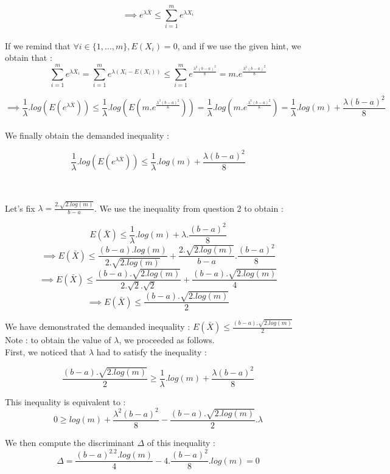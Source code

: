 \documentclass[final,3p,times,12pt]{article}
\begin{document}
\[
\implies  e^{\lambda\bar{X}} \leq \sum_{i=1}^m e^{\lambda X_i} \]\\

If we remind that $\forall i \in \{1,\dots,m\}, E(X_i) = 0$, and if we use the given hint, we obtain that : 
\[
\sum_{i=1}^m e^{\lambda X_i} = \sum_{i=1}^m e^{\lambda(X_i - E(X_i))} \leq \sum_{i=1}^m e^{\frac{\lambda^2(b-a)^2}{8}} = m.e^{\frac{\lambda^2(b-a)^2}{8}}\]

\[ \implies \frac{1}{\lambda}.log(E(e^{\lambda\bar{X}})) \leq \frac{1}{\lambda}.log(E(m.e^{\frac{\lambda^2(b-a)^2}{8}})) = \frac{1}{\lambda}.log(m.e^{\frac{\lambda^2(b-a)^2}{8}}) = \frac{1}{\lambda}.log(m) +  \frac{\lambda(b-a)^2}{8}\]\\

We finally obtain the demanded inequality : 

\[ \frac{1}{\lambda}.log(E(e^{\lambda\bar{X}})) \leq \frac{1}{\lambda}.log(m) +  \frac{\lambda(b-a)^2}{8}\]\\

\subsection{} Let's fix $\lambda = \frac{2.\sqrt{2.log(m)}}{b-a}$. We use the inequality from question 2 to obtain :  

\[ E(\bar{X}) \leq \frac{1}{\lambda}.log(m) + \lambda.\frac{(b-a)^2}{8}\]
\[ \implies E(\bar{X}) \leq \frac{(b-a).log(m)}{2.\sqrt{2.log(m)}} + \frac{2.\sqrt{2.log(m)}}{b-a}.\frac{(b-a)^2}{8}\]
\[ \implies E(\bar{X}) \leq \frac{(b-a).\sqrt{2.log(m)}}{2.\sqrt{2}.\sqrt{2}} + \frac{(b-a).\sqrt{2.log(m)}}{4}\]
\[ \implies E(\bar{X}) \leq \frac{(b-a).\sqrt{2.log(m)}}{2} \]

We have demonstrated the demanded inequality : $E(\bar{X}) \leq \frac{(b-a).\sqrt{2.log(m)}}{2}$ \\

Note : to obtain the value of $\lambda$, we proceeded as follows.\\

First, we noticed that $\lambda$ had to satisfy the inequality : 

\[\frac{(b-a).\sqrt{2.log(m)}}{2} \geq \frac{1}{\lambda}.log(m) +  \frac{\lambda(b-a)^2}{8}\]

This inequality is equivalent to : 
\[
0 \geq log(m) +  \frac{\lambda^2(b-a)^2}{8} - \frac{(b-a).\sqrt{2.log(m)}}{2}.\lambda
\]

We then compute the discriminant $\Delta$ of this inequality : 
\[
\Delta = \frac{(b-a)^2.2.log(m)}{4} - 4.\frac{(b-a)^2}{8}.log(m) = 0
\]
\end{document}
